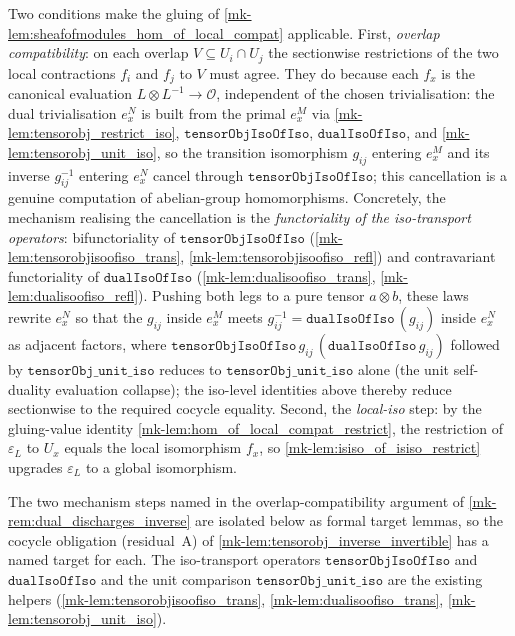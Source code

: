 \begin{remark}
  Two conditions make the gluing of \ref{mk-lem:sheafofmodules_hom_of_local_compat} applicable.
  First, \emph{overlap compatibility}: on each overlap \(V \subseteq U_i \cap U_j\) the
  sectionwise restrictions of the two local contractions \(f_i\) and \(f_j\) to \(V\) must
  agree. They do because each \(f_x\) is the canonical evaluation
  \(L \otimes L^{-1} \to \mathcal{O}\), independent of the chosen trivialisation: the dual
  trivialisation \(e^N_x\) is built from the primal \(e^M_x\) via
  \ref{mk-lem:tensorobj_restrict_iso}, \(\mathtt{tensorObjIsoOfIso}\), \(\mathtt{dualIsoOfIso}\),
  and \ref{mk-lem:tensorobj_unit_iso}, so the transition isomorphism \(g_{ij}\) entering
  \(e^M_x\) and its inverse \(g_{ij}^{-1}\) entering \(e^N_x\) cancel through
  \(\mathtt{tensorObjIsoOfIso}\); this cancellation is a genuine computation of abelian-group
  homomorphisms. Concretely, the mechanism realising the cancellation is the
  \emph{functoriality of the iso-transport operators}: bifunctoriality of
  \(\mathtt{tensorObjIsoOfIso}\) (\ref{mk-lem:tensorobjisoofiso_trans}, \ref{mk-lem:tensorobjisoofiso_refl})
  and contravariant functoriality of \(\mathtt{dualIsoOfIso}\) (\ref{mk-lem:dualisoofiso_trans},
  \ref{mk-lem:dualisoofiso_refl}). Pushing both legs to a pure tensor \(a \otimes b\), these laws
  rewrite \(e^N_x\) so that the \(g_{ij}\) inside \(e^M_x\) meets \(g_{ij}^{-1} = \mathtt{dualIsoOfIso}\,
  (g_{ij})\) inside \(e^N_x\) as adjacent factors, where \(\mathtt{tensorObjIsoOfIso}\,g_{ij}\,
  (\mathtt{dualIsoOfIso}\,g_{ij})\) followed by \(\mathtt{tensorObj\_unit\_iso}\) reduces to
  \(\mathtt{tensorObj\_unit\_iso}\) alone (the unit self-duality evaluation collapse); the
  iso-level identities above thereby reduce sectionwise to the required cocycle equality.
  Second, the \emph{local-iso} step: by the gluing-value identity
  \ref{mk-lem:hom_of_local_compat_restrict}, the restriction of \(\varepsilon_L\) to \(U_x\)
  equals the local isomorphism \(f_x\), so \ref{mk-lem:isiso_of_isiso_restrict} upgrades
  \(\varepsilon_L\) to a global isomorphism.
\end{remark}

The two mechanism steps named in the overlap-compatibility argument of
\ref{mk-rem:dual_discharges_inverse} are isolated below as formal target lemmas, so the
cocycle obligation (residual~A) of \ref{mk-lem:tensorobj_inverse_invertible} has a named
target for each. The iso-transport operators
\(\mathtt{tensorObjIsoOfIso}\) and \(\mathtt{dualIsoOfIso}\) and the unit comparison
\(\mathtt{tensorObj\_unit\_iso}\) are the existing helpers
(\ref{mk-lem:tensorobjisoofiso_trans}, \ref{mk-lem:dualisoofiso_trans},
\ref{mk-lem:tensorobj_unit_iso}).

